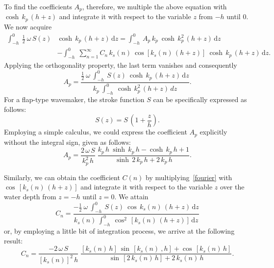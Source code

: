 \documentclass[12pt,a4paper]{report}
\begin{document}
To find the coefficients $A_p$, therefore, we multiple the above equation with $\cosh \,k_{p} \,(h + z)$ and integrate it with respect to the variable $z$ from $-h$ until $0$. We now acquire
\begin{align}
\int_{-h}^{0} \: \frac{1}{2} \: \omega \, S(z) & \cosh \, k_{p} \,(h + z) \, \mathrm{d}z 
= \int_{-h}^{0} \: A_{p} \, k_{p} \: \cosh \, k_{p}^2 \,(h + z) \, \mathrm{d}z \nonumber \\
&- \int_{-h}^{0} \; \sum_{n = 1}^{\infty} C_{n} \, k_{s}(n) \: \cos \left[k_{s}(n) \, (h + z) \right] \: \cosh \,k_{p}\,(h + z) \, \mathrm{d}z.
\end{align}
Applying the orthogonality property, the last term vanishes and consequently
\begin{equation}
A_{p} = \frac{\displaystyle \frac{1}{2} \: \omega \: \int_{-h}^{0} \: S(z) \: \cosh \, k_{p} \,(h + z) \, \mathrm{d}z}
{\displaystyle k_{p} \: \int_{-h}^{0} \: \cosh \,k_{p}^2 \, (h + z) \,dz}.
\end{equation}
For a flap-type wavemaker, the stroke function $S$ can be specifically expressed as follows:
\begin{equation}
S(z) = S \, \left(1 + \frac{z}{h} \right).
\end{equation}
Employing a simple calculus, we could express the coefficient $A_{p}$ explicitly without the integral sign, given as follows:
\begin{equation}
A_{p} = \frac{2 \, \omega \, S}{k_{p}^2\,h} \; \frac{k_{p} \, h \: \sinh \,k_{p} \,h - \cosh \,k_{p}\,h + 1}{\sinh \, 2 \, k_{p} \, h + 2 \,k_{p} \,h}.  \label{firstconst}
\end{equation}

Similarly, we can obtain the coefficient $C(n)$ by multiplying~\eqref{fourier} with $\cos \,[k_{s}(n) \, (h + z)]$ and integrate it with respect to the variable $z$ over the water depth from $z = -h$ until $z = 0$. We attain
\begin{equation}
C_{n} = \frac{\displaystyle -\frac{1}{2} \: \omega \: \int_{-h}^{0} \: S(z) \: \cos \, k_{s}(n)\,(h + z) \, \mathrm{d}z}
{\displaystyle k_{s}(n) \: \int_{-h}^{0} \: \cos^2 \, [k_{s}(n) \, (h + z)] \,\mathrm{d}z}
\end{equation}
or, by employing a little bit of integration process, we arrive at the following result:
\begin{equation}
C_{n} = \frac{-2 \, \omega \, S}{[k_{s}(n)]^2 \, h} \; \frac{[k_{s}(n) \, h] \: \sin \, [k_{s}(n) \ ,h] + \cos \,[k_{s}(n) \, h]}{\sin \, [2 \, k_{s}(n) \, h] + 2 \, k_{s}(n) \, h}. 			\label{nextconst}
\end{equation}
\end{document}
